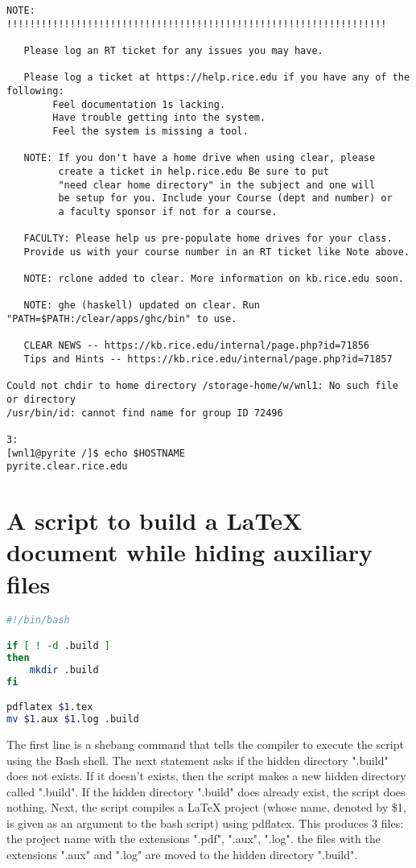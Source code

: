\documentclass{article}
\begin{document}
\begin{verbatim}
NOTE: !!!!!!!!!!!!!!!!!!!!!!!!!!!!!!!!!!!!!!!!!!!!!!!!!!!!!!!!!!!!!!!!!!

   Please log an RT ticket for any issues you may have.

   Please log a ticket at https://help.rice.edu if you have any of the following:
        Feel documentation 1s lacking.
        Have trouble getting into the system.
        Feel the system is missing a tool.

   NOTE: If you don't have a home drive when using clear, please
         create a ticket in help.rice.edu Be sure to put
         "need clear home directory" in the subject and one will
         be setup for you. Include your Course (dept and number) or
         a faculty sponsor if not for a course.

   FACULTY: Please help us pre-populate home drives for your class.
   Provide us with your course number in an RT ticket like Note above.

   NOTE: rclone added to clear. More information on kb.rice.edu soon.

   NOTE: ghe (haskell) updated on clear. Run "PATH=$PATH:/clear/apps/ghc/bin" to use.

   CLEAR NEWS -- https://kb.rice.edu/internal/page.php?id=71856
   Tips and Hints -- https://kb.rice.edu/internal/page.php?id=71857

Could not chdir to home directory /storage-home/w/wnl1: No such file or directory
/usr/bin/id: cannot find name for group ID 72496

3:
[wnl1@pyrite /]$ echo $HOSTNAME
pyrite.clear.rice.edu
\end{verbatim}

\section{A script to build a LaTeX document while hiding auxiliary files}

\begin{lstlisting}[language=bash, basicstyle=\ttfamily, caption={Bash script to build LaTeX document.}]
#!/bin/bash

if [ ! -d .build ]
then
	mkdir .build
fi

pdflatex $1.tex
mv $1.aux $1.log .build
\end{lstlisting}

The first line is a shebang command that tells the compiler to execute the script using the Bash shell. The next statement asks if the hidden directory ".build" does not exists. If it doesn't exists, then the script makes a new hidden directory called ".build". If the hidden directory ".build" does already exist, the script does nothing. Next, the script compiles a LaTeX project (whose name, denoted by \$1,  is given as an argument to the bash script) using pdflatex. This produces 3 files: the project name with the extensions ".pdf", ".aux", ".log". the files with the extensions ".aux" and ".log" are moved to the hidden directory ".build".
\end{document}
